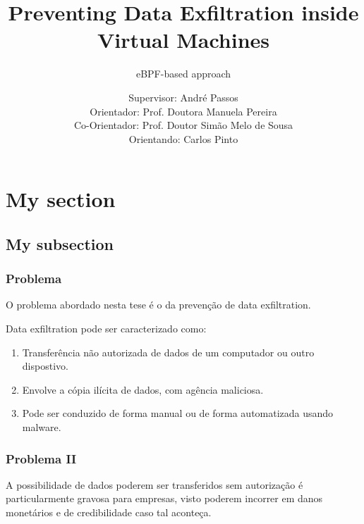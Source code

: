 \documentclass[pdflatex,compress]{beamer}
\title{Preventing Data Exfiltration inside Virtual Machines}
\subtitle{eBPF-based approach}
\author{Supervisor: André Passos\\
Orientador: Prof. Doutora Manuela Pereira\\
Co-Orientador: Prof. Doutor Simão Melo de Sousa\\
\bigskip\bigskip 
Orientando: Carlos Pinto}
\begin{document}
\maketitle

\section{My section}
\subsection{My subsection}

\begin{frame}
\frametitle{Problema}

O problema abordado nesta tese é o da prevenção de data exfiltration. 
\pause \bigskip

Data exfiltration pode ser caracterizado como: 
\begin{enumerate}
    \pause
    \item Transferência não autorizada de dados de um computador ou outro dispostivo. 
        \pause 
    \item Envolve a cópia ilícita de dados, com agência maliciosa. 
        \pause
    \item Pode ser conduzido de forma manual ou de forma automatizada usando malware. 
\end{enumerate}

\end{frame}

\begin{frame}
\frametitle{Problema II}

A possibilidade de dados poderem ser transferidos sem autorização é particularmente gravosa para empresas, visto poderem incorrer em danos monetários e de credibilidade caso tal aconteça. 

\end{frame}
\end{document}
